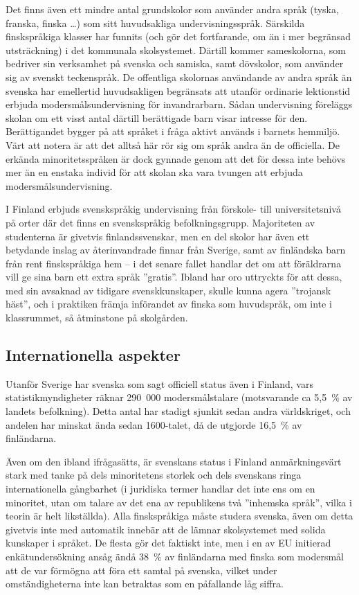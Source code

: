 \begin{multicols}{2}
Det finns även ett mindre antal grundskolor som använder andra språk
(tyska, franska, finska \ldots) som sitt huvudsakliga
undervisningsspråk. Särskilda finskspråkiga klasser har funnits (och
gör det fortfarande, om än i mer begränsad utsträckning) i det
kommunala skolsystemet. Därtill kommer sameskolorna, som bedriver sin
verksamhet på svenska och samiska, samt dövskolor, som använder sig av
svenskt teckenspråk. De offentliga skolornas användande av andra språk
än svenska har emellertid huvudsakligen begränsats att utanför
ordinarie lektionstid erbjuda modersmålsundervisning för
invandrarbarn. Sådan undervisning föreläggs skolan om ett visst antal
därtill berättigade barn visar intresse för den. Berättigandet bygger
på att språket i fråga aktivt används i barnets hemmiljö. Värt att
notera är att det alltså här rör sig om språk andra än de
officiella. De erkända minoritetsspråken är dock gynnade genom att det
för dessa inte behövs mer än en enstaka individ för att skolan ska
vara tvungen att erbjuda modersmålsundervisning.

I Finland erbjuds svenskspråkig undervisning från förskole- till
universitetsnivå på orter där det finns en svenskspråkig
befolkningsgrupp. Majoriteten av studenterna är givetvis
finlandssvenskar, men en del skolor har även ett betydande inslag av
återinvandrade finnar från Sverige, samt av finländska barn från rent
finskspråkiga hem -- i det senare fallet handlar det om att föräldrarna
vill ge sina barn ett extra språk ''gratis''. Ibland har oro uttryckts
för att dessa, med sin avsaknad av tidigare svenskkunskaper, skulle
kunna agera ''trojansk häst'', och i praktiken främja införandet av
finska som huvudspråk, om inte i klassrummet, så åtminstone på
skolgården.

\subsection{Internationella aspekter}

Utanför Sverige har svenska som sagt officiell status även i Finland,
vars statistikmyndigheter räknar 290~000 modersmålstalare (motsvarande
ca 5,5~\% av landets befolkning). Detta antal har stadigt sjunkit
sedan andra världskriget, och andelen har minskat ända sedan
1600-talet, då de utgjorde 16,5~\% av finländarna.

Även om den ibland ifrågasätts, är svenskans status i Finland
anmärkningsvärt stark med tanke på dels minoritetens storlek och dels
svenskans ringa internationella gångbarhet (i juridiska termer handlar
det inte ens om en minoritet, utan om talare av det ena av republikens
två ''inhemska språk'', vilka i teorin är helt likställda). Alla
finskspråkiga måste studera svenska, även om detta givetvis inte med
automatik innebär att de lämnar skolsystemet med solida kunskaper i
språket. De flesta gör det faktiskt inte, men i en av EU initierad
enkätundersökning\cite{EC243} ansåg ändå 38~\% av
finländarna med finska som modersmål att de var förmögna att föra ett
samtal på svenska, vilket under omständigheterna inte kan betraktas
som en påfallande låg siffra.


\end{multicols}
